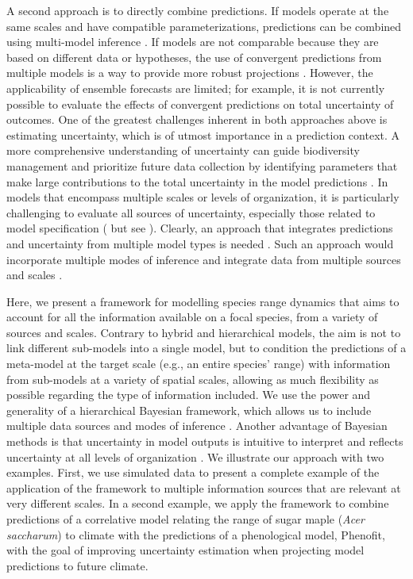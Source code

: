 A second approach is to directly combine predictions.
If models operate at the same scales and have compatible parameterizations, predictions can be combined using multi-model inference \citep[e.g., model averaging, ensemble forecasting;][]{Araujo2007, Diniz-Filho2009}. 
If models are not comparable because they are based on different data or hypotheses, the use of convergent predictions from multiple models is a way to provide more robust projections \citep{Morin2009, Marmion2009, Serra-Diaz2013}.
However, the applicability of ensemble forecasts are limited; for example, it is not currently possible to evaluate the effects of convergent predictions on total uncertainty of outcomes.
One of the greatest challenges inherent in both approaches above is estimating uncertainty, which is of utmost importance in a prediction context.
A more comprehensive understanding of uncertainty can guide biodiversity management and prioritize future data collection by identifying parameters that make large contributions to the total uncertainty in the model predictions \citep{McMahon2011}. 
In models that encompass multiple scales or levels of organization, it is particularly challenging to evaluate all sources of uncertainty, especially those related to model specification (\citealt{Calder2003} but see \citealt{Conlisk2013}).
Clearly, an approach that integrates predictions and uncertainty from multiple model types is needed \citep{Beck2012, Thuiller2013}. 
Such an approach would incorporate multiple modes of inference and integrate data from multiple sources and scales \citep{Levin1992, Peters2004, Thuiller2013}.

Here, we present a framework for modelling species range dynamics that aims to account for all the information available on a focal species, from a variety of sources and scales.
Contrary to hybrid and hierarchical models, the aim is not to link different sub-models into a single model, but to condition the predictions of a meta-model at the target scale (e.g., an entire species' range) with information from sub-models at a variety of spatial scales, allowing as much flexibility as possible regarding the type of information included. 
We use the power and generality of a hierarchical Bayesian framework, which allows us to include multiple data sources and modes of inference \citep{Clark2005, VanOijen2005, Clark2006, Hobbs2011, Hartig2012}. 
Another advantage of Bayesian methods is that uncertainty in model outputs is intuitive to interpret and reflects uncertainty at all levels of organization \citep{Clark2005, Cressie2009, Hobbs2011}. 
We illustrate our approach with two examples.
First, we use simulated data to present a complete example of the application of the framework to multiple information sources that are relevant at very different scales.
In a second example, we apply the framework to combine predictions of a correlative model relating the range of sugar maple (\emph{Acer saccharum}) to climate with the predictions of a phenological model, Phenofit, with the goal of improving uncertainty estimation when projecting model predictions to future climate.

